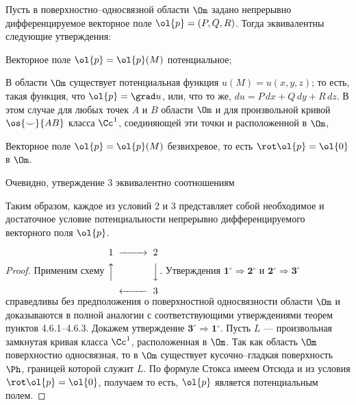 \documentclass[a4paper]{article}
\begin{document}
\begin{theorem}
Пусть в поверхностно--односвязной области $\Om$ задано непрерывно
дифференцируемое векторное поле $\ol{p}=(P,Q,R)$. Тогда эквивалентны
следующие утверждения:
\begin{points}{-2}
\item Векторное поле $\ol{p}=\ol{p}(M)$ потенциальное;

\item В области $\Om$ существует потенциальная функция
$u(M)=u(x,y,z)$; то есть, такая функция, что $\ol{p}=\grad u$, или,
что то же, $du=P\,dx+Q\,dy+R\,dz$. В этом случае для любых точек $A$
и $B$ области $\Om$ и для произвольной кривой $\os{\smile}{AB}$
класса $\Cc^1$, соединяющей эти точки и расположенной в $\Om$,

\item Векторное поле $\ol{p}=\ol{p}(M)$ безвихревое, то есть
$\rot\ol{p}=\ol{0}$ в $\Om$.
\end{points}

Очевидно, утверждение 3 эквивалентно соотношениям 

Таким образом, каждое из условий 2 и 3 представляет собой
необходимое и достаточное условие потенциальности непрерывно
дифференцируемого векторного поля $\ol{p}$.
\end{theorem}
\begin{proof}
Применим схему $\begin{CD} 1@>>> 2\\ @AAA @VVV \\ @<<< 3\end{CD}$.
Утверждения $\textbf{1}^{\circ} \Rightarrow \textbf{2}^{\circ}$ и
$\textbf{2}^{\circ} \Rightarrow \textbf{3}^{\circ}$ справедливы без
предположения о поверхностной односвязности области $\Om$ и
доказываются в полной аналогии с соответствующими утверждениями
теорем пунктов 4.6.1--4.6.3. Докажем утверждение $\textbf{3}^{\circ}
\Rightarrow \textbf{1}^{\circ}$. Пусть $L$ --- произвольная
замкнутая кривая класса $\Cc^1$, расположенная в $\Om$. Так как
область $\Om$ поверхностно односвязная, то в $\Om$ существует
кусочно--гладкая поверхность $\Ph$, границей которой служит $L$. По
формуле Стокса имеем  Отсюда и из условия
$\rot\ol{p}=\ol{0}$, получаем 
то есть, $\ol{p}$ является потенциальным полем.
\end{proof}
\end{document}
